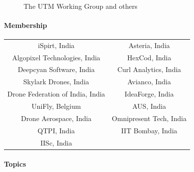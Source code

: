 \documentclass{ua_wgs_base}
\begin{document}
\begin{figure}[tbh]
\begin{centering}
\begin{center}
\small\tt
\hfil 
{}
\hfil \end{center}
\par\end{centering}
\caption{The UTM Working Group and others}
\end{figure}


\paragraph*{Membership}
\begin{center}
\begin{tabular}{|c|c|}
\hline 
iSpirt, India & Asteria, India\tabularnewline
Algopixel Technologies, India\footnotemark & HexCod, India\tabularnewline
Deepcyan Software, India\footnotemark[\value{footnote}] & Curl Analytics, India\tabularnewline
Skylark Drones, India\footnotemark[\value{footnote}] & Avianco, India\footnotemark[\value{footnote}]\tabularnewline
Drone Federation of India, India\footnotemark[\value{footnote}] & IdeaForge, India\tabularnewline
UniFly, Belgium\footnotemark[\value{footnote}] & AUS, India\tabularnewline
Drone Aerospace, India & Omnipresent Tech, India\tabularnewline
QTPI, India & IIT Bombay, India\tabularnewline
IISc, India & \tabularnewline
\hline 
\end{tabular}
\par\end{center}

\begin{center}
\par\end{center}

\paragraph*{Topics}
\end{document}
